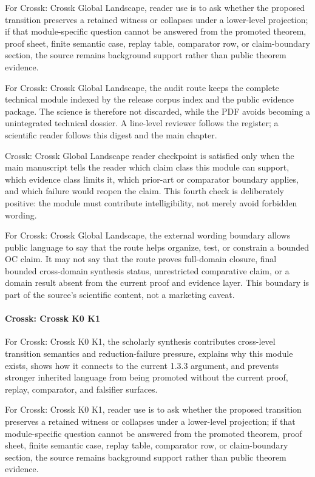 For Crossk: Crossk Global Landscape, reader use is to ask whether the proposed transition preserves a retained witness or collapses under a lower-level projection; if that module-specific question cannot be answered from the promoted theorem, proof sheet, finite semantic case, replay table, comparator row, or claim-boundary section, the source remains background support rather than public theorem evidence.


For Crossk: Crossk Global Landscape, the audit route keeps the complete technical module indexed by the release corpus index and the public evidence package. The science is therefore not discarded, while the PDF avoids becoming a unintegrated technical dossier. A line-level reviewer follows the register; a scientific reader follows this digest and the main chapter.


Crossk: Crossk Global Landscape reader checkpoint is satisfied only when the main manuscript tells the reader which claim class this module can support, which evidence class limits it, which prior-art or comparator boundary applies, and which failure would reopen the claim. This fourth check is deliberately positive: the module must contribute intelligibility, not merely avoid forbidden wording.


For Crossk: Crossk Global Landscape, the external wording boundary allows public language to say that the route helps organize, test, or constrain a bounded OC claim. It may not say that the route proves full-domain closure, final bounded cross-domain synthesis status, unrestricted comparative claim, or a domain result absent from the current proof and evidence layer. This boundary is part of the source's scientific content, not a marketing caveat.


\paragraph{Crossk: Crossk K0 K1}

For Crossk: Crossk K0 K1, the scholarly synthesis contributes cross-level transition semantics and reduction-failure pressure, explains why this module exists, shows how it connects to the current 1.3.3 argument, and prevents stronger inherited language from being promoted without the current proof, replay, comparator, and falsifier surfaces.


For Crossk: Crossk K0 K1, reader use is to ask whether the proposed transition preserves a retained witness or collapses under a lower-level projection; if that module-specific question cannot be answered from the promoted theorem, proof sheet, finite semantic case, replay table, comparator row, or claim-boundary section, the source remains background support rather than public theorem evidence.


